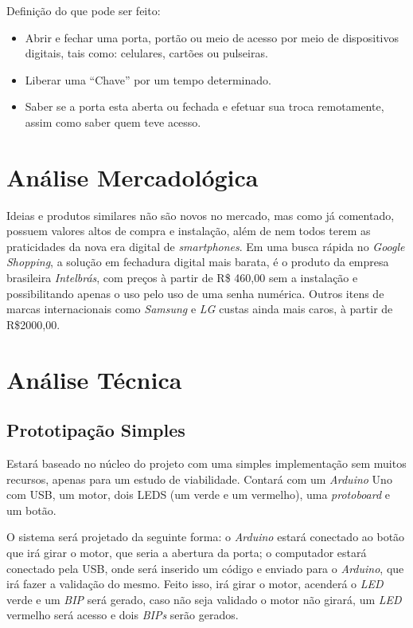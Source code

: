 \documentclass[12pt]{article}
\begin{document}
Definição do que pode ser feito:
\begin{itemize}
\item Abrir e fechar uma porta, portão ou meio de acesso por meio de dispositivos digitais, tais como: celulares, cartões ou pulseiras.
\item Liberar uma “Chave” por um tempo determinado.
\item Saber se a porta esta aberta ou fechada e efetuar sua troca remotamente, assim como saber quem teve acesso.

\end{itemize}


\section{Análise Mercadológica} \label{sec:firstpage}

Ideias e produtos similares não são novos no mercado, mas como já comentado, possuem valores altos de compra e instalação, além de nem todos terem as praticidades da nova era digital de \textit{smartphones}. Em uma busca rápida no \textit{Google Shopping}, a solução em fechadura digital mais barata, é o produto da empresa brasileira \textit{Intelbrás}, com preços à partir de R\$ 460,00 sem a instalação e possibilitando apenas o uso pelo uso de uma senha numérica. Outros itens de marcas internacionais como \textit{Samsung} e \textit{LG} custas ainda mais caros, à partir de R\$2000,00.

\section{Análise Técnica}

\subsection{Prototipação Simples}
Estará baseado no núcleo do projeto com uma simples implementação sem muitos recursos, apenas para um estudo de viabilidade. Contará com um \textit{Arduino} Uno com USB, um motor, dois LEDS (um verde e um vermelho), uma \textit{protoboard} e um botão. 

O sistema será projetado da seguinte forma: o \textit{Arduino} estará conectado ao botão que irá girar o motor, que seria a abertura da porta; o computador estará conectado pela USB, onde será inserido um código  e enviado para o \textit{Arduino}, que irá fazer a validação do mesmo. Feito isso, irá girar o motor, acenderá o \textit{LED} verde e um \textit{BIP} será gerado, caso não seja validado o motor não girará,  um \textit{LED} vermelho será acesso e dois \textit{BIPs} serão gerados. 
\end{document}
